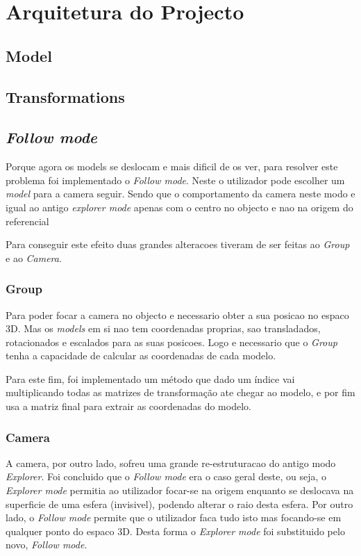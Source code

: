 \documentclass[a4paper]{article}
\begin{document}
\section{Arquitetura do Projecto}

\subsection{Model}

\subsection{Transformations}

\subsection{\textit{Follow mode}}
Porque agora os models se deslocam e mais dificil de os ver, para resolver este problema
foi implementado o \textit{Follow mode}. Neste o utilizador pode escolher um \textit{model}
para a camera seguir. Sendo que o comportamento da camera neste modo e igual ao antigo
\textit{explorer mode} apenas com o centro no objecto e nao na origem do referencial

Para conseguir este efeito duas grandes alteracoes tiveram de ser feitas ao \textit{Group} e ao
\textit{Camera}.

\subsubsection{Group}

Para poder focar a camera no objecto e necessario obter a sua posicao no espaco 3D. Mas os
\textit{models} em si nao tem coordenadas proprias, sao transladados, rotacionados e escalados para as suas posicoes. Logo e necessario que o \textit{Group} tenha a capacidade de calcular as coordenadas de cada modelo.

Para este fim, foi implementado um método que dado um índice vai multiplicando todas as matrizes de transformação ate chegar ao modelo, e por fim usa a matriz final para extrair as coordenadas do modelo.

\subsubsection{Camera}

A camera, por outro lado, sofreu uma grande re-estruturacao do antigo modo \textit{Explorer}.
Foi concluido que o \textit{Follow mode} era o caso geral deste, ou seja, o \textit{Explorer mode}
permitia ao utilizador focar-se na origem enquanto se deslocava na superficie de uma esfera (invisivel), podendo alterar o raio desta esfera. Por outro lado, o \textit{Follow mode} permite
que o utilizador faca tudo isto mas focando-se em qualquer ponto do espaco 3D. Desta forma o \textit{Explorer mode} foi substituido pelo novo, \textit{Follow mode}.
\end{document}
